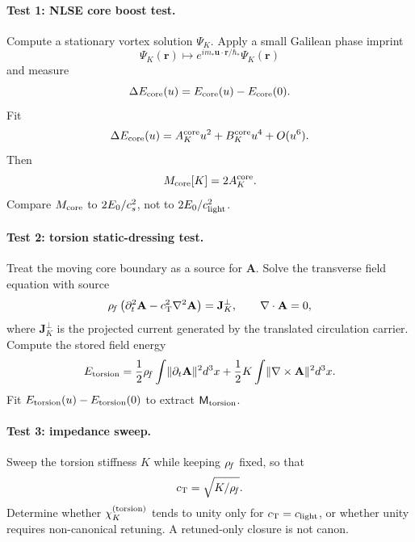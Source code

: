 \paragraph{Test 1: NLSE core boost test.}
Compute a stationary vortex solution \(\Psi_K\).  Apply a small Galilean phase imprint
\begin{equation}
    \Psi_K(\mathbf r)\mapsto e^{i m_*\mathbf u\cdot\mathbf r/\hbar_*}\Psi_K(\mathbf r)
\end{equation}
and measure
\begin{equation}
    \Delta E_{\mathrm{core}}(u)=E_{\mathrm{core}}(u)-E_{\mathrm{core}}(0).
\end{equation}
Fit
\begin{equation}
    \Delta E_{\mathrm{core}}(u)=A_K^{\mathrm{core}}u^2+B_K^{\mathrm{core}}u^4+O(u^6).
\end{equation}
Then
\begin{equation}
    M_{\mathrm{core}}[K]=2A_K^{\mathrm{core}}.
\end{equation}
Compare \(M_{\mathrm{core}}\) to \(2E_0/c_s^2\), not to \(2E_0/c_{\mathrm{light}}^2\).

\paragraph{Test 2: torsion static-dressing test.}
Treat the moving core boundary as a source for \(\mathbf A\).  Solve the transverse field equation with source
\begin{equation}
    \rho_{\!f}\left(\partial_t^2\mathbf A-c_{\mathrm{T}}^2\nabla^2\mathbf A\right)
    =
    \mathbf J_K^\perp,
    \qquad
    \nabla\cdot\mathbf A=0,
\end{equation}
where \(\mathbf J_K^\perp\) is the projected current generated by the translated circulation carrier.  Compute the stored field energy
\begin{equation}
    E_{\mathrm{torsion}}
    =
    \frac12\rho_{\!f}\int\lVert\partial_t\mathbf A\rVert^2d^3x
    +
    \frac12K\int\lVert\nabla\times\mathbf A\rVert^2d^3x.
\end{equation}
Fit \(E_{\mathrm{torsion}}(u)-E_{\mathrm{torsion}}(0)\) to extract \(\mathsf M_{\mathrm{torsion}}\).

\paragraph{Test 3: impedance sweep.}
Sweep the torsion stiffness \(K\) while keeping \(\rho_{\!f}\) fixed, so that
\begin{equation}
    c_{\mathrm{T}}=\sqrt{K/\rho_{\!f}}.
\end{equation}
Determine whether \(\chi_K^{(\mathrm{torsion})}\) tends to unity only for \(c_{\mathrm{T}}=c_{\mathrm{light}}\), or whether unity requires non-canonical retuning.  A retuned-only closure is not canon.

